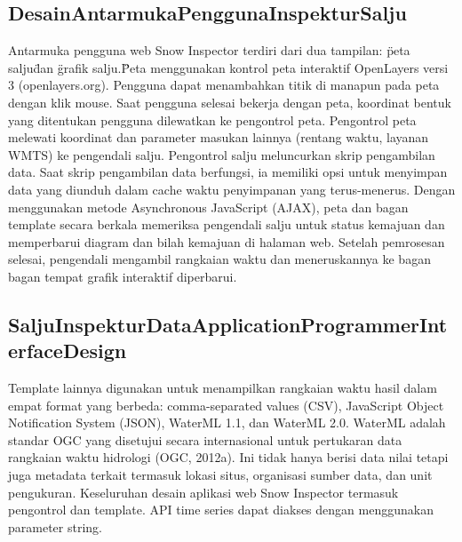 \cite{Kadlec2016Extracting}

\subsection{DesainAntarmukaPenggunaInspekturSalju}

Antarmuka pengguna web Snow Inspector terdiri dari dua tampilan: \"peta salju\" dan \"grafik salju.\" Peta menggunakan kontrol peta interaktif OpenLayers versi 3 (openlayers.org). Pengguna dapat menambahkan titik di manapun pada peta dengan klik mouse. Saat pengguna selesai bekerja dengan peta, koordinat bentuk yang ditentukan pengguna dilewatkan ke pengontrol peta. Pengontrol peta melewati koordinat dan parameter masukan lainnya (rentang waktu, layanan WMTS) ke pengendali salju. Pengontrol salju meluncurkan skrip pengambilan data. Saat skrip pengambilan data berfungsi, ia memiliki opsi untuk menyimpan data yang diunduh dalam cache waktu penyimpanan yang terus-menerus. Dengan menggunakan metode Asynchronous JavaScript (AJAX), peta dan bagan template secara berkala memeriksa pengendali salju untuk status kemajuan dan memperbarui diagram dan bilah kemajuan di halaman web. Setelah pemrosesan selesai, pengendali mengambil rangkaian waktu dan meneruskannya ke bagan bagan tempat grafik interaktif diperbarui.

\cite{Kadlec2016Extracting}

\subsection{SaljuInspekturDataApplicationProgrammerInterfaceDesign}

Template lainnya digunakan untuk menampilkan rangkaian waktu hasil dalam empat format yang berbeda: comma-separated values ​​(CSV), JavaScript Object Notification System (JSON), WaterML 1.1, dan WaterML 2.0. WaterML adalah standar OGC yang disetujui secara internasional untuk pertukaran data rangkaian waktu hidrologi (OGC, 2012a). Ini tidak hanya berisi data nilai tetapi juga metadata terkait termasuk lokasi situs, organisasi sumber data, dan unit pengukuran. Keseluruhan desain aplikasi web Snow Inspector termasuk pengontrol dan template. API time series dapat diakses dengan menggunakan parameter string.

\cite{Kadlec2016Extracting}

